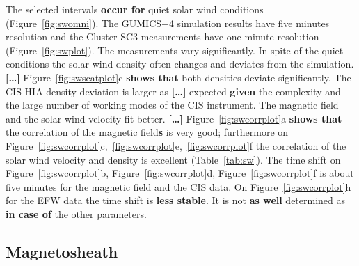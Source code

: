 \documentclass[linenumbers,draft]{agujournal}
\begin{document}
The selected intervals \textbf{occur for} quiet solar wind conditions (Figure~\ref{fig:swomni}). The GUMICS$-$4 simulation results have five minutes resolution and the Cluster SC3 measurements have one minute resolution (Figure~\ref{fig:swplot}). The measurements vary significantly. In spite of the quiet conditions the solar wind density often changes and deviates from the simulation. \textbf{[\dots]} Figure~\ref{fig:swscatplot}c \textbf{shows that} both densities deviate significantly. The CIS HIA density deviation is larger as \textbf{[\dots]} expected \textbf{given} the complexity and the large number of working modes of the CIS instrument. The magnetic field and the solar wind velocity fit better. \textbf{[\dots]} Figure~\ref{fig:swcorrplot}a \textbf{shows that} the correlation of the magnetic field\textbf{s} is very good; furthermore on Figure~\ref{fig:swcorrplot}c,~\ref{fig:swcorrplot}e,~\ref{fig:swcorrplot}f the correlation of the solar wind velocity and density is excellent (Table~\ref{tab:sw}). The time shift on Figure~\ref{fig:swcorrplot}b, Figure~\ref{fig:swcorrplot}d, Figure~\ref{fig:swcorrplot}f is about five minutes for the magnetic field and the CIS data. On Figure~\ref{fig:swcorrplot}h for the EFW data the time shift is \textbf{less stable}. It is not \textbf{as well} determined as \textbf{in case of} the other parameters.

\subsection{Magnetosheath}
\label{sec:msh}
\end{document}
